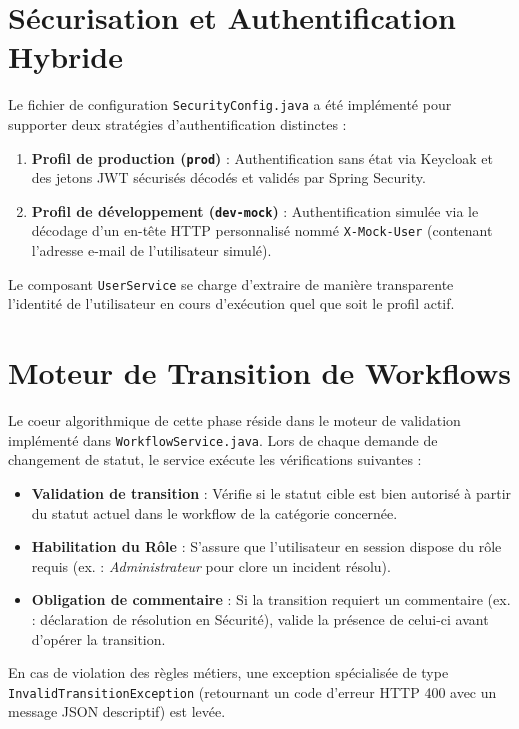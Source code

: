 \documentclass[12pt,a4paper]{article}
\begin{document}
\section{Sécurisation et Authentification Hybride}
Le fichier de configuration \texttt{SecurityConfig.java} a été implémenté pour supporter deux stratégies d'authentification distinctes :
\begin{enumerate}
    \item \textbf{Profil de production (\texttt{prod})} : Authentification sans état via Keycloak et des jetons JWT sécurisés décodés et validés par Spring Security.
    \item \textbf{Profil de développement (\texttt{dev-mock})} : Authentification simulée via le décodage d'un en-tête HTTP personnalisé nommé \texttt{X-Mock-User} (contenant l'adresse e-mail de l'utilisateur simulé).
\end{enumerate}

Le composant \texttt{UserService} se charge d'extraire de manière transparente l'identité de l'utilisateur en cours d'exécution quel que soit le profil actif.

\section{Moteur de Transition de Workflows}
Le coeur algorithmique de cette phase réside dans le moteur de validation implémenté dans \texttt{WorkflowService.java}. Lors de chaque demande de changement de statut, le service exécute les vérifications suivantes :
\begin{itemize}
    \item \textbf{Validation de transition} : Vérifie si le statut cible est bien autorisé à partir du statut actuel dans le workflow de la catégorie concernée.
    \item \textbf{Habilitation du Rôle} : S'assure que l'utilisateur en session dispose du rôle requis (ex. : \textit{Administrateur} pour clore un incident résolu).
    \item \textbf{Obligation de commentaire} : Si la transition requiert un commentaire (ex. : déclaration de résolution en Sécurité), valide la présence de celui-ci avant d'opérer la transition.
\end{itemize}

En cas de violation des règles métiers, une exception spécialisée de type \texttt{InvalidTransitionException} (retournant un code d'erreur HTTP 400 avec un message JSON descriptif) est levée.
\end{document}

